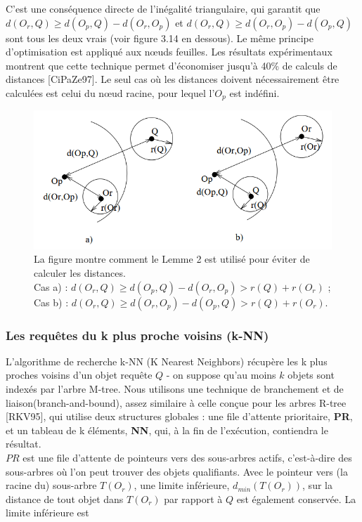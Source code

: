 C'est une conséquence directe de l'inégalité triangulaire, qui garantit que $ d(O_r, Q) \ge d(O_p, Q)-d(O_r, O_p) $ et $  d(O_r, Q) \ge d(O_r, O_p)-d(O_p, Q) $ sont tous les deux vrais (voir figure 3.14 en dessous). Le même principe d'optimisation est appliqué aux nœuds feuilles. Les résultats expérimentaux montrent que cette technique permet d'économiser jusqu'à 40\% de calculs de distances [CiPaZe97]. Le seul cas où les distances doivent nécessairement être calculées est celui du nœud racine, pour lequel l'$ O_p $ est indéfini.

\begin{figure}[H]
	\centering
	\includegraphics[width=.6 \textwidth]{Figures/lemme.png} %
	\caption{La figure montre comment le Lemme 2 est utilisé pour éviter de calculer les distances. \\Cas a) : $ d(O_r, Q) \ge d(O_p, Q) - d(O_r, O_p) > r(Q) + r(O_r) $ ; \\
		Cas b) : $ d(O_r, Q) \ge d(O_r, O_p) - d(O_p, Q) > r(Q) + r(O_r) $.}
\end{figure} 

\subsubsection{Les requêtes du k plus proche voisins (k-NN)}

L'algorithme de recherche k-NN (K Nearest Neighbors) récupère les k plus proches voisins d'un objet requête $ Q $ - on suppose qu'au moins $ k $ objets sont indexés par l'arbre M-tree. Nous utilisons une technique de branchement et de liaison(branch-and-bound), assez similaire à celle conçue pour les arbres R-tree [RKV95], qui utilise deux structures globales : une file d'attente prioritaire, \textbf{PR}, et un tableau de k éléments, \textbf{NN}, qui, à la fin de l'exécution, contiendra le résultat.\\

$ PR $ est une file d'attente de pointeurs vers des sous-arbres actifs, c'est-à-dire des sous-arbres où l'on peut trouver des objets qualifiants. Avec le pointeur vers (la racine du) sous-arbre $ T (O_r) $, une limite inférieure, $ d_{min}(T (O_r)) $, sur la distance de tout objet dans $ T (O_r) $ par rapport à $ Q $ est également conservée. La limite inférieure est

